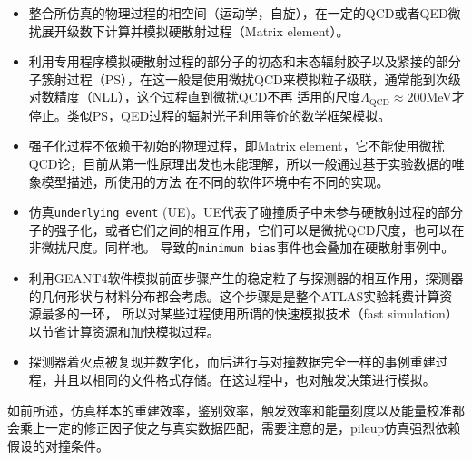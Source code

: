 \begin{itemize}
  \item 整合所仿真的物理过程的相空间（运动学，自旋），在一定的QCD或者QED微扰展开级数下计算并模拟硬散射过程（Matrix element）。
  \item 利用专用程序模拟硬散射过程的部分子的初态和末态辐射胶子以及紧接的部分子簇射过程（PS），在这一般是使用微扰QCD来模拟粒子级联，通常能到次级对数精度（NLL），这个过程直到微扰QCD不再
  适用的尺度$\Lambda_{\text{QCD}}\approx200$MeV才停止。类似PS，QED过程的辐射光子利用等价的数学框架模拟。
  \item 强子化过程不依赖于初始的物理过程，即Matrix element，它不能使用微扰QCD论，目前从第一性原理出发也未能理解，所以一般通过基于实验数据的唯象模型描述，所使用的方法
      在不同的软件环境中有不同的实现。
   \item 仿真\texttt{underlying event} (UE)。UE代表了碰撞质子中未参与硬散射过程的部分子的强子化，或者它们之间的相互作用，它们可以是微扰QCD尺度，也可以在非微扰尺度。同样地。
   导致\pileup 的\texttt{minimum bias}事件也会叠加在硬散射事例中。
   \item 利用GEANT4软件\cite{AGOSTINELLI2003250}模拟前面步骤产生的稳定粒子与探测器的相互作用，探测器的几何形状与材料分布都会考虑\cite{Aad2010-atlas-simu}。这个步骤是是整个ATLAS实验耗费计算资源最多的一环，
     所以对某些过程使用所谓的快速模拟技术（fast simulation）\cite{Lukas:2012kua}以节省计算资源和加快模拟过程。
    \item 探测器着火点被复现并数字化，而后进行与对撞数据完全一样的事例重建过程，并且以相同的文件格式存储。在这过程中，也对触发决策进行模拟。
 \end{itemize}
 如前所述，仿真样本的重建效率，鉴别效率，触发效率和能量刻度以及能量校准都会乘上一定的修正因子使之与真实数据匹配，需要注意的是，pileup仿真强烈依赖假设的对撞条件。
